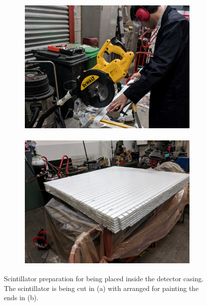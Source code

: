 \begin{figure}[!h]
\centering
\begin{subfigure}{.5\textwidth}
  \centering
  \includegraphics[width=\linewidth]{Chapter3/Figs/Raster/detCon003bb_CuttingScint.png}
  \captionsetup{width=.9\linewidth}
  \caption{}
  \label{subFig:detCon003bb_CuttingScint}
\end{subfigure}%
\begin{subfigure}{.5\textwidth}
  \centering
  \includegraphics[width=\linewidth]{Chapter3/Figs/Raster/detCon005b_PaintingEnds.png}
  \captionsetup{width=.9\linewidth}
  \caption{}
  \label{subFig:detCon005b_PaintingEnds}
\end{subfigure}
\caption[Scintillator preparation cut in (a) painted ends in (b)]{Scintillator preparation for being placed inside the detector casing. The scintillator is being cut in (a) with arranged for painting the ends in (b).}
\label{fig:detCon_CuttingScint_PaintingEnds}
\end{figure}

